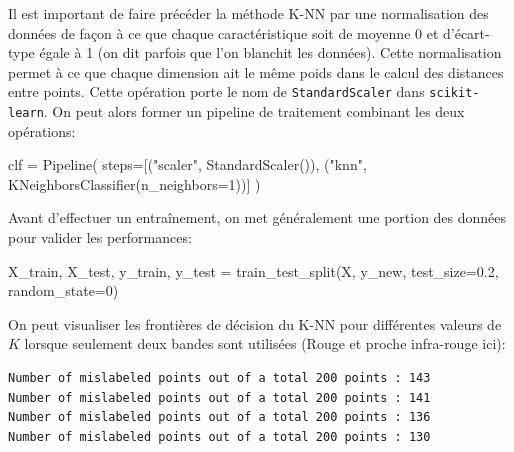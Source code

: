 \documentclass[
  11pt,
  letterpaper,
  open=any,
  twoside=false,
  french]{scrbook}
\newenvironment{Shaded}{\begin{snugshade}}{\end{snugshade}}
\newcommand{\DecValTok}[1]{\textcolor[rgb]{0.68,0.00,0.00}{#1}}
\newcommand{\FloatTok}[1]{\textcolor[rgb]{0.68,0.00,0.00}{#1}}
\newcommand{\NormalTok}[1]{\textcolor[rgb]{0.00,0.23,0.31}{#1}}
\newcommand{\OperatorTok}[1]{\textcolor[rgb]{0.37,0.37,0.37}{#1}}
\newcommand{\StringTok}[1]{\textcolor[rgb]{0.13,0.47,0.30}{#1}}
\begin{document}
Il est important de faire précéder la méthode K-NN par une normalisation
des données de façon à ce que chaque caractéristique soit de moyenne 0
et d'écart-type égale à 1 (on dit parfois que l'on blanchit les
données). Cette normalisation permet à ce que chaque dimension ait le
même poids dans le calcul des distances entre points. Cette opération
porte le nom de \texttt{StandardScaler} dans \texttt{scikit-learn}. On
peut alors former un pipeline de traitement combinant les deux
opérations:

\begin{Shaded}
\begin{Highlighting}[]
\NormalTok{clf }\OperatorTok{=}\NormalTok{ Pipeline(}
\NormalTok{    steps}\OperatorTok{=}\NormalTok{[(}\StringTok{"scaler"}\NormalTok{, StandardScaler()), (}\StringTok{"knn"}\NormalTok{, KNeighborsClassifier(n\_neighbors}\OperatorTok{=}\DecValTok{1}\NormalTok{))]}
\NormalTok{)}
\end{Highlighting}
\end{Shaded}

Avant d'effectuer un entraînement, on met généralement une portion des
données pour valider les performances:

\begin{Shaded}
\begin{Highlighting}[]
\NormalTok{X\_train, X\_test, y\_train, y\_test }\OperatorTok{=}\NormalTok{ train\_test\_split(X, y\_new, test\_size}\OperatorTok{=}\FloatTok{0.2}\NormalTok{, random\_state}\OperatorTok{=}\DecValTok{0}\NormalTok{)}
\end{Highlighting}
\end{Shaded}

On peut visualiser les frontières de décision du K-NN pour différentes
valeurs de \(K\) lorsque seulement deux bandes sont utilisées (Rouge et
proche infra-rouge ici):

\begin{verbatim}
Number of mislabeled points out of a total 200 points : 143
Number of mislabeled points out of a total 200 points : 141
Number of mislabeled points out of a total 200 points : 136
Number of mislabeled points out of a total 200 points : 130
\end{verbatim}
\end{document}
